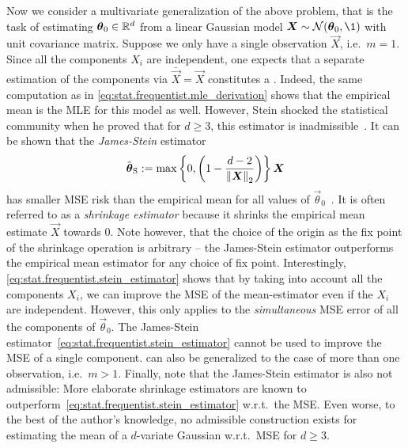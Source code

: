 Now we consider a multivariate generalization of the above problem, that is the task of estimating ${\boldsymbol{\theta}}_0 \in \mathbb{R}^d$ from a linear Gaussian model $\vec X \sim \Normal(\vec\theta_0, \1)$ with unit covariance matrix.
Suppose we only have a single observation $\vec X$, i.e.\ $m=1$.
Since all the components $X_i$ are independent, one expects that a separate estimation of the components via $\bar{\vec X} = \vec X$ constitutes a .
Indeed, the same computation as in \cref{eq:stat.frequentist.mle_derivation} shows that the empirical mean is the MLE for this model as well.
However, Stein shocked the statistical community when he proved that for $d \ge 3$, this estimator is inadmissible~\cite{Stein_1956_Inadmissibility}.
It can be shown that the \emph{James-Stein} estimator
\[
  \label{eq:stat.frequentist.stein_estimator}
  \hat{{\boldsymbol{\theta}}}_{\mathrm{S}} := \max\left\{0, \left( 1 - \frac{d - 2}{{\Vert{\boldsymbol{X}}\Vert}_2} \right) \right\} {\boldsymbol{X}}
\]
has smaller MSE risk than the empirical mean for all values of $\vec \theta_0$~\cite{Stein_1956_Inadmissibility,Lehmann_1998_Theory}.
It is often referred to as a \emph{shrinkage estimator} because it shrinks the empirical mean estimate $\vec X$ towards 0.
Note however, that the choice of the origin as the fix point of the shrinkage operation is arbitrary -- the James-Stein estimator outperforms the empirical mean estimator for any choice of fix point.
Interestingly, \cref{eq:stat.frequentist.stein_estimator} shows that by taking into account all the components $X_i$, we can improve the MSE of the mean-estimator even if the $X_i$ are independent.
However, this only applies to the \emph{simultaneous} MSE error of all the components of $\vec \theta_0$.
The James-Stein estimator~\eqref{eq:stat.frequentist.stein_estimator} cannot be used to improve the MSE of a single component.
 can also be generalized to the case of more than one observation, i.e.\ $m > 1$.
Finally, note that the James-Stein estimator is also not admissible:
More elaborate shrinkage estimators are known to outperform~\eqref{eq:stat.frequentist.stein_estimator} w.r.t.\ the MSE.
Even worse, to the best of the author's knowledge, no admissible construction exists for estimating the mean of a $d$-variate Gaussian w.r.t.\ MSE for $d \ge 3$.\\


